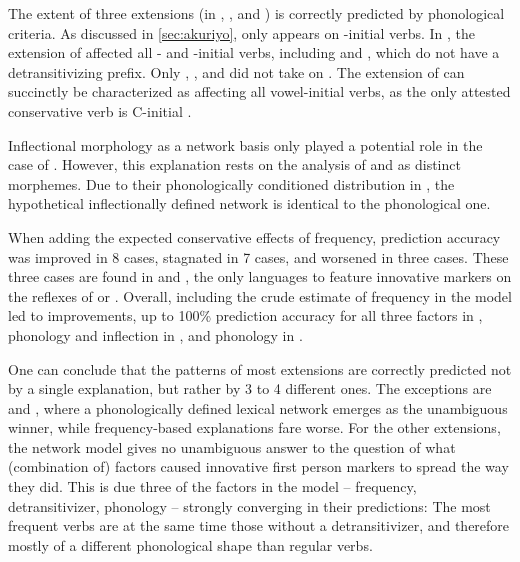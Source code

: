 The extent of three extensions (in \akuriyo, \carijo, and \yukpa) is correctly predicted by phonological criteria.
As discussed in \cref{sec:akuriyo}, \akuriyo {} only appears on -initial verbs.
In \carijo, the extension of  affected all - and -initial verbs, including   and  , which do not have a detransitivizing prefix.
Only  ,  , and   did not take on .
The extension of \yukpa {} can succinctly be characterized as affecting all vowel-initial verbs, as the only attested conservative verb is C-initial  .

Inflectional morphology as a network basis only played a potential role in the case of \akuriyo.
However, this explanation rests on the analysis of  and  as distinct morphemes.
Due to their phonologically conditioned distribution in \PTir, the hypothetical inflectionally defined network is identical to the phonological one.

When adding the expected conservative effects of frequency, prediction accuracy was improved in 8 cases, stagnated in 7 cases, and worsened in three cases.
These three cases are found in \carijo and \yukpa, the only languages to feature innovative markers on the reflexes of   or  .
Overall, including the crude estimate of frequency in the model led to improvements, up to 100\% prediction accuracy for all three factors in \PTir, phonology and inflection in \PWai, and phonology in \PPek.

One can conclude that the patterns of most extensions are correctly predicted not by a single explanation, but rather by 3 to 4 different ones.
The exceptions are \carijo and \yukpa, where a phonologically defined lexical network emerges as the unambiguous winner, while frequency-based explanations fare worse.
For the other extensions, the network model gives no unambiguous answer to the question of what (combination of) factors caused innovative first person markers to spread the way they did.
This is due three of the factors in the model -- frequency, detransitivizer, phonology -- strongly converging in their predictions:
The most frequent  verbs are at the same time those without a detransitivizer, and therefore mostly of a different phonological shape than regular  verbs.
